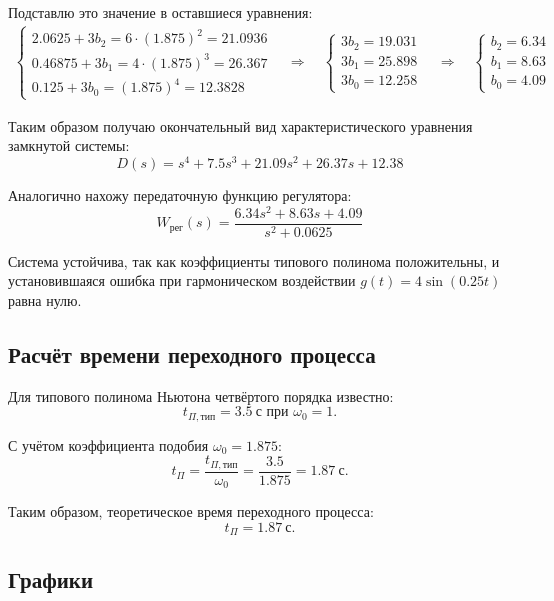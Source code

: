\documentclass[a4paper,12pt]{article}
\begin{document}
	Подставлю это значение в оставшиеся уравнения:
	\[
	\begin{aligned}
		\begin{cases}
			2.0625 + 3b_2 = 6 \cdot (1.875)^2 = 21.0936 \\
			0.46875 + 3b_1 = 4 \cdot (1.875)^3 = 26.367 \\
			0.125 + 3b_0 = (1.875)^4 = 12.3828
		\end{cases} 
			\quad \Longrightarrow \quad
		\begin{cases}
			3b_2 = 19.031 \\
			3b_1 = 25.898 \\
			3b_0 = 12.258
		\end{cases}
			\quad \Longrightarrow \quad
		\begin{cases}
			b_2 = 6.34  \\
			b_1 = 8.63 \\
			b_0 = 4.09
		\end{cases}
	\end{aligned}
	\]
	
	Таким образом получаю окончательный вид характеристического уравнения замкнутой системы:
	\[
	D(s) = s^4 + 7.5s^3 + 21.09s^2 + 26.37s + 12.38
	\]
	
	Аналогично нахожу передаточную функцию регулятора:
	\[
	W_\text{рег}(s) = \frac{6.34s^2 + 8.63s + 4.09}{s^2 + 0.0625}
	\]
	
	Система устойчива, так как коэффициенты типового полинома положительны, и установившаяся ошибка при гармоническом воздействии \( g(t) = 4\sin(0.25t) \) равна нулю.
	
	\subsection{Расчёт времени переходного процесса}
	
	Для типового полинома Ньютона четвёртого порядка известно:
	\[
	t_{\Pi,\text{тип}} = 3.5~\text{с при } \omega_0 = 1.
	\]
	
	С учётом коэффициента подобия $\omega_0 = 1.875$:
	\[
	t_{\Pi} = \frac{t_{\Pi,\text{тип}}}{\omega_0} = \frac{3.5}{1.875} = 1.87~\text{с}.
	\]
	
	\noindent Таким образом, теоретическое время переходного процесса:
	\[
	t_{\Pi} = 1.87~\text{с}.
	\]
	
	\subsection{Графики}
	
\end{document}

